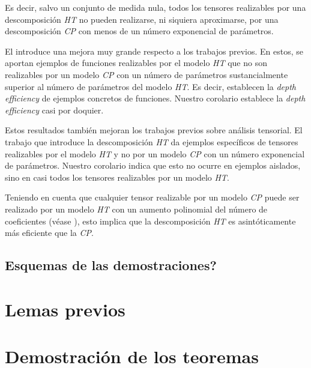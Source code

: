 Es decir, salvo un conjunto de medida nula, todos los tensores realizables por una descomposición \textit{HT} no pueden realizarse, ni siquiera aproximarse, por una descomposición \textit{CP} con menos de un número exponencial de parámetros.

El  introduce una mejora muy grande respecto a los trabajos previos. En estos, se aportan ejemplos de funciones realizables por el modelo \textit{HT} que no son realizables por un modelo \textit{CP} con un número de parámetros sustancialmente superior al número de parámetros del modelo \textit{HT}. Es decir, establecen la \textit{depth efficiency} de ejemplos concretos de funciones. Nuestro corolario establece la \textit{depth efficiency} casi por doquier.

Estos resultados también mejoran los trabajos previos sobre análisis tensorial. El trabajo que introduce la descomposición \textit{HT} \cite{matematicas:descomposicion_ht} da ejemplos específicos de tensores realizables por el modelo \textit{HT} y no por un modelo \textit{CP} con un número exponencial de parámetros. Nuestro corolario indica que esto no ocurre en ejemplos aislados, sino en casi todos los tensores realizables por un modelo \textit{HT}.

Teniendo en cuenta que cualquier tensor realizable por un modelo \textit{CP} puede ser realizado por un modelo \textit{HT} con un aumento polinomial del número de coeficientes (véase ), esto implica que la descomposición \textit{HT} es asintóticamente más eficiente que la \textit{CP}.

\subsection{Esquemas de las demostraciones?}

\section{Lemas previos}

\section{Demostración de los teoremas}
